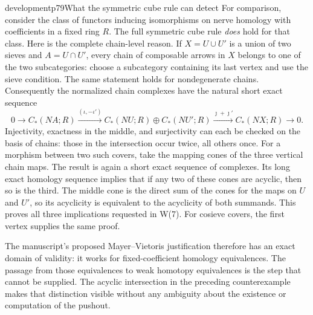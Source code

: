 \begin{dcomment}{development}{p79}{What the symmetric cube rule can detect}
For comparison, consider the class of functors inducing isomorphisms on nerve homology with coefficients in a fixed ring $R$. The full symmetric cube rule \emph{does} hold for that class. Here is the complete chain-level reason. If $X=U\cup U'$ is a union of two sieves and $A=U\cap U'$, every chain of composable arrows in $X$ belongs to one of the two subcategories: choose a subcategory containing its last vertex and use the sieve condition. The same statement holds for nondegenerate chains. Consequently the normalized chain complexes have the natural short exact sequence
\[
0\longrightarrow C_*(NA;R)
 \xrightarrow{(\iota,-\iota')}
 C_*(NU;R)\oplus C_*(NU';R)
 \xrightarrow{\jmath+\jmath'} C_*(NX;R)
 \longrightarrow0.
\]
Injectivity, exactness in the middle, and surjectivity can each be checked on the basis of chains: those in the intersection occur twice, all others once. For a morphism between two such covers, take the mapping cones of the three vertical chain maps. The result is again a short exact sequence of complexes. Its long exact homology sequence implies that if any two of these cones are acyclic, then so is the third. The middle cone is the direct sum of the cones for the maps on $U$ and $U'$, so its acyclicity is equivalent to the acyclicity of both summands. This proves all three implications requested in W(7). For cosieve covers, the first vertex supplies the same proof.

The manuscript's proposed Mayer--Vietoris justification therefore has an exact domain of validity: it works for fixed-coefficient homology equivalences. The passage from those equivalences to weak homotopy equivalences is the step that cannot be supplied. The acyclic intersection in the preceding counterexample makes that distinction visible without any ambiguity about the existence or computation of the pushout.
\end{dcomment}

